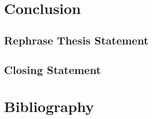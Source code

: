 \documentclass[11pt,a4paper]{article}
\begin{document}
\section{Conclusion}
	\subsection{Rephrase Thesis Statement}
	\subsection{Closing Statement}

\newpage
\section{Bibliography}
\nocite{*}


\end{document}
